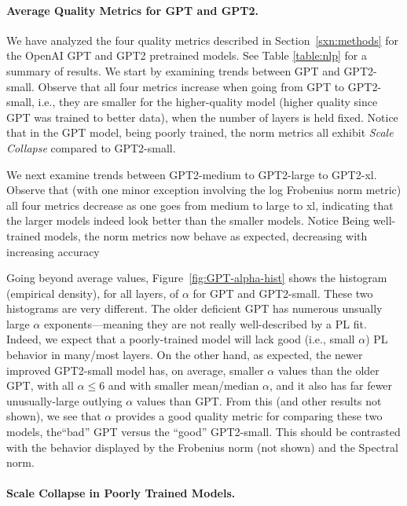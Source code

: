 \paragraph{Average Quality Metrics for GPT and GPT2.}

We have analyzed the four quality metrics described in Section~\ref{sxn:methods} for the OpenAI GPT and GPT2 pretrained models.
See Table \ref{table:nlp} for a summary of results.
We start by examining trends between GPT and GPT2-small.
Observe that all four metrics increase when going from GPT to GPT2-small, i.e., they are smaller for the higher-quality model (higher quality since GPT was trained to better data), when the number of layers is held fixed.
Notice that in the GPT model, being poorly trained, the norm metrics all exhibit \emph{Scale Collapse} compared to GPT2-small.

We next examine trends between GPT2-medium to GPT2-large to GPT2-xl.
Observe that (with one minor exception involving the log Frobenius norm metric) all four metrics decrease as one goes from medium to large to xl, indicating that the larger models indeed look better than the smaller models.
Notice
Being well-trained models, the norm metrics now behave as expected, decreasing with increasing accuracy

Going beyond average values, Figure~\ref{fig:GPT-alpha-hist} shows the histogram (empirical density), for all layers, of $\alpha$ for GPT and GPT2-small.  
These two histograms are very different.
The older deficient GPT has numerous unsually large $\alpha$ exponents---meaning they are not really well-described by a PL fit.
Indeed, we expect that a poorly-trained model will lack good (i.e., small $\alpha$) PL behavior in many/most layers.
On the other hand, as expected, the newer improved GPT2-small model has, on average, smaller $\alpha$ values than the older GPT, with all $\alpha\le6$ and with smaller mean/median $\alpha$, and it also has far fewer unusually-large outlying $\alpha$ values than GPT.
From this (and other results not shown), we see that $\alpha$ provides a good quality metric for comparing these two models, the``bad'' GPT versus the ``good'' GPT2-small.
%
This should be contrasted with the behavior displayed by the Frobenius norm (not shown) and the Spectral norm.


\paragraph{Scale Collapse in Poorly Trained Models.}

